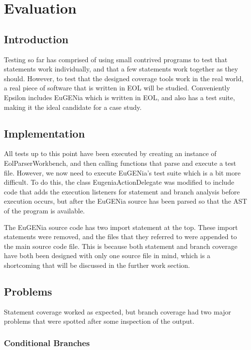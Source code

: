 \chapter{Evaluation}

\section{Introduction}

Testing so far has comprised of using small contrived programs to test that statements work individually, and that a few statements work together as they should. However, to test that the designed coverage tools work in the real world, a real piece of software that is written in EOL will be studied. Conveniently Epsilon includes EuGENia which is written in EOL, and also has a test suite, making it the ideal candidate for a case study.

\section{Implementation}

All tests up to this point have been executed by creating an instance of EolParserWorkbench, and then calling functions that parse and execute a test file. However, we now need to execute EuGENia's test suite which is a bit more difficult. To do this, the class EugeniaActionDelegate was modified to include code that adds the execution listeners for statement and branch analysis before execution occurs, but after the EuGENia source has been parsed so that the AST of the program is available.

The EuGENia source code has two import statement at the top. These import statements were removed, and the files that they referred to were appended to the main source code file. This is because both statement and branch coverage have both been designed with only one source file in mind, which is a shortcoming that will be discussed in the further work section.

\section{Problems}

Statement coverage worked as expected, but branch coverage had two major problems that were spotted after some inspection of the output. 

\subsection{Conditional Branches}

